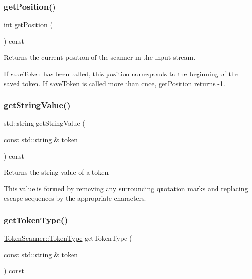 \subsubsection{\texorpdfstring{get\+Position()}{getPosition()}}
{\footnotesize\ttfamily int get\+Position (\begin{DoxyParamCaption}{ }\end{DoxyParamCaption}) const}



Returns the current position of the scanner in the input stream. 

If {\ttfamily save\+Token} has been called, this position corresponds to the beginning of the saved token. If {\ttfamily save\+Token} is called more than once, {\ttfamily get\+Position} returns -\/1. \mbox{\label{classTokenScanner_ac9f2b60ecc3007903307c3cb49fd5df1}} 
\subsubsection{\texorpdfstring{get\+String\+Value()}{getStringValue()}}
{\footnotesize\ttfamily std\+::string get\+String\+Value (\begin{DoxyParamCaption}\item[{const std\+::string \&}]{token }\end{DoxyParamCaption}) const}



Returns the string value of a token. 

This value is formed by removing any surrounding quotation marks and replacing escape sequences by the appropriate characters. \mbox{\label{classTokenScanner_a8f4bb404c615ef48e20db70c1870048e}} 
\subsubsection{\texorpdfstring{get\+Token\+Type()}{getTokenType()}}
{\footnotesize\ttfamily \mbox{\hyperlink{classTokenScanner_aa520fbf142ba1e7e659590c07da31921}{Token\+Scanner\+::\+Token\+Type}} get\+Token\+Type (\begin{DoxyParamCaption}\item[{const std\+::string \&}]{token }\end{DoxyParamCaption}) const}



